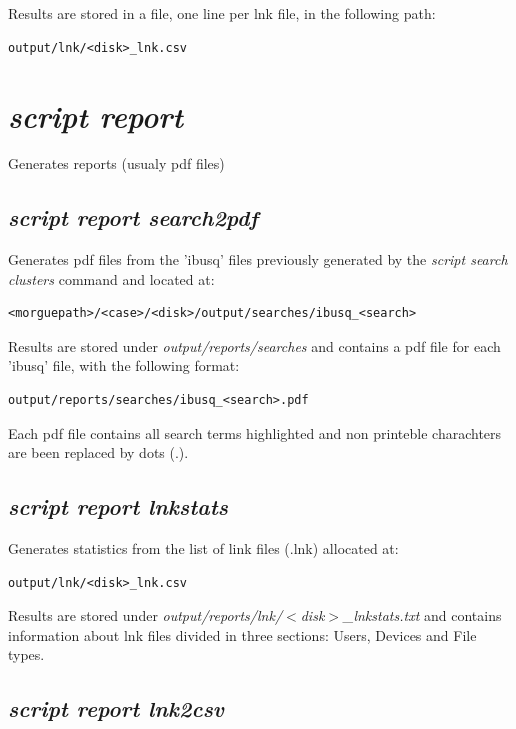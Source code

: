 \documentclass[a4paper,11pt,oneside]{report}
\begin{document}
Results are stored in a file, one line per lnk file, in the following path:

\begin{verbatim}
output/lnk/<disk>_lnk.csv
\end{verbatim}


\section{\emph{script report}}

Generates reports (usualy pdf files)

\subsection{\emph{script report search2pdf}} 

Generates pdf files from the 'ibusq' files previously generated by the  \emph{script search clusters} command and located at:

\begin{verbatim}
<morguepath>/<case>/<disk>/output/searches/ibusq_<search>
\end{verbatim}

Results are stored under \emph{output/reports/searches} and contains a pdf file for each 'ibusq' file, with the following format:

\begin{verbatim}
output/reports/searches/ibusq_<search>.pdf
\end{verbatim}

Each pdf file contains all search terms highlighted and non printeble charachters are been replaced by dots (.).

\subsection{\emph{script report lnkstats}}

Generates statistics from the list of link files (.lnk) allocated at:
\begin{verbatim}
output/lnk/<disk>_lnk.csv
\end{verbatim}

Results are stored under \emph{output/reports/lnk/$<$disk$>$\_lnkstats.txt} and contains information about lnk files divided in three sections: Users, Devices and File types.

\subsection{\emph{script report lnk2csv}}
\end{document}
